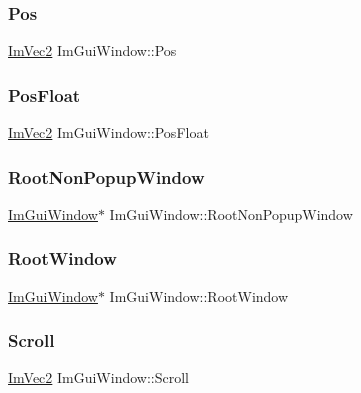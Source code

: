 \subsubsection{\texorpdfstring{Pos}{Pos}}
{\footnotesize\ttfamily \hyperlink{struct_im_vec2}{Im\+Vec2} Im\+Gui\+Window\+::\+Pos}

\hypertarget{struct_im_gui_window_a84170962470c8078195dad980cdfc1c0}{}\label{struct_im_gui_window_a84170962470c8078195dad980cdfc1c0} 
\subsubsection{\texorpdfstring{Pos\+Float}{PosFloat}}
{\footnotesize\ttfamily \hyperlink{struct_im_vec2}{Im\+Vec2} Im\+Gui\+Window\+::\+Pos\+Float}

\hypertarget{struct_im_gui_window_a43b1e2ffa15d572f4d0ce4fbbeb5595f}{}\label{struct_im_gui_window_a43b1e2ffa15d572f4d0ce4fbbeb5595f} 
\subsubsection{\texorpdfstring{Root\+Non\+Popup\+Window}{RootNonPopupWindow}}
{\footnotesize\ttfamily \hyperlink{struct_im_gui_window}{Im\+Gui\+Window}$\ast$ Im\+Gui\+Window\+::\+Root\+Non\+Popup\+Window}

\hypertarget{struct_im_gui_window_aef9281297b0993c8f1b7c1ff7987cb61}{}\label{struct_im_gui_window_aef9281297b0993c8f1b7c1ff7987cb61} 
\subsubsection{\texorpdfstring{Root\+Window}{RootWindow}}
{\footnotesize\ttfamily \hyperlink{struct_im_gui_window}{Im\+Gui\+Window}$\ast$ Im\+Gui\+Window\+::\+Root\+Window}

\hypertarget{struct_im_gui_window_abf20537560b9454a1e39667b8f9e7ff2}{}\label{struct_im_gui_window_abf20537560b9454a1e39667b8f9e7ff2} 
\subsubsection{\texorpdfstring{Scroll}{Scroll}}
{\footnotesize\ttfamily \hyperlink{struct_im_vec2}{Im\+Vec2} Im\+Gui\+Window\+::\+Scroll}

